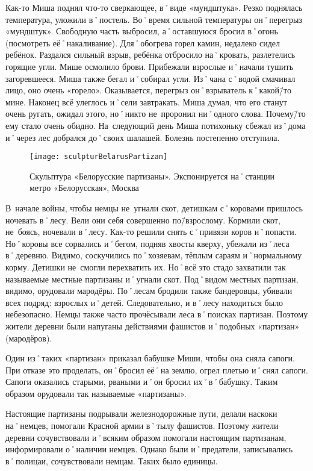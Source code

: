 Как-то Миша поднял что-то сверкающее, в˚виде «мундштука». Резко поднялась температура, уложили в˚постель. Во˚время сильной температуры он˚перегрыз «мундштук». Свободную часть выбросил, а˚оставшуюся бросил в˚огонь (посмотреть её˚накаливание). Для˚обогрева горел камин, недалеко сидел ребёнок. Раздался сильный взрыв, ребёнка отбросило на˚кровать, разлетелись горящие угли. Мише осмолило брови. Прибежали взрослые и˚начали тушить загоревшееся. Миша также бегал и˚собирал угли. Из˚чана с˚водой смачивал лицо, оно очень «горело». Оказывается, перегрыз он˚взрыватель к˚какой\=/то мине. Наконец всё улеглось и˚сели завтракать. Миша думал, что его станут очень ругать, ожидал этого, но˚никто не~проронил ни˚одного слова. Почему\=/то ему стало очень обидно. На~следующий день Миша потихоньку сбежал из˚дома и˚через лес добрался до˚своих шалашей. Болезнь постепенно отступила. 

\begin{wrapfigure}{O}{.4\textwidth}
\centering
\texttt{[image: sculpturBelarusPartizan]}
\caption{Скульптура «Белорусские партизаны». Экспонируется на˚станции метро «Белорусская», Москва}
\label{fig:sculpturBelarusPartizan}
\end{wrapfigure}

В~начале войны, чтобы немцы не~угнали скот, детишкам с˚коровами пришлось ночевать в˚лесу. Вели они себя совершенно по\=/взрослому. Кормили скот, не~боясь, ночевали в˚лесу. Как-то решили снять с˚привязи коров и˚попасти. Но˚коровы все сорвались и˚бегом, подняв хвосты кверху, убежали из˚леса в˚деревню. Видимо, соскучились по˚хозяевам, тёплым сараям и˚нормальному корму. Детишки не~смогли перехватить их. Но˚всё это стадо захватили так называемые местные партизаны и˚угнали скот. Под˚видом местных партизан, видимо, орудовали мародёры. По˚лесам бродили также бандеровцы, убивали всех подряд: взрослых и˚детей. Следовательно, и в˚лесу находиться было небезопасно. Немцы также часто прочёсывали леса в˚поисках партизан. Поэтому жители деревни были напуганы действиями фашистов и˚подобных «партизан» (мародёров). 

Один из˚таких «партизан» приказал бабушке Миши, чтобы она сняла сапоги. При отказе это проделать, он˚бросил её˚на землю, огрел плетью и˚снял сапоги. Сапоги оказались старыми, рваными и˚он бросил их˚в˚бабушку. Таким образом орудовали так называемые «партизаны».

Настоящие партизаны подрывали железнодорожные пути, делали наскоки на˚немцев, помогали Красной армии в˚тылу фашистов. Поэтому жители деревни сочувствовали и˚всяким образом помогали настоящим партизанам, информировали о˚наличии немцев. Однако были и˚предатели, записывались в˚полицаи, сочувствовали немцам. Таких было единицы. 

